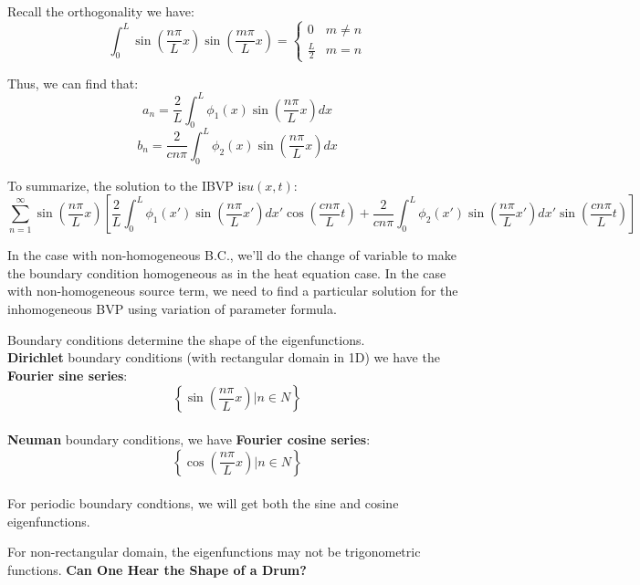 \documentclass[12pt]{article} %
\begin{document}
Recall the orthogonality we have:
$$
\int_{0}^{L}\sin(\frac{n\pi}{L}x)\sin(\frac{m\pi}{L}x) = \left\{
\begin{array}{lll}
 0& m\neq n \\
\frac{L}{2} & m= n
\end{array}\right.
$$ \par
Thus, we can find that:
$$
a_{n}=\frac{2}{L}\int_{0}^{L}\phi_{1}(x)\sin(\frac{n\pi}{L}x)dx
$$
$$
b_{n}=\frac{2}{cn\pi}\int_{0}^{L}\phi_{2}(x)\sin(\frac{n\pi}{L}x)dx
$$\par
To summarize, the solution to the IBVP is$u(x, t)$:
$$
\sum_{n=1}^{\infty}\sin(\frac{n\pi}{L}x)\left[\frac{2}{L}\int_{0}^{L}\phi_{1}(x')\sin(\frac{n\pi}{L}x')dx'\cos(\frac{cn\pi}{L}t) +
\frac{2}{cn\pi}\int_{0}^{L}\phi_{2}(x')\sin(\frac{n\pi}{L}x')dx'\sin(\frac{cn\pi}{L}t)\right]
$$\par
In the case with non-homogeneous B.C., we'll do the change of variable to make the boundary condition homogeneous as in the heat equation case. In the case with non-homogeneous source term, we need to find a particular solution for the inhomogeneous BVP using variation of parameter formula. \par
Boundary conditions determine the shape of the eigenfunctions. \\
\textbf{Dirichlet} boundary conditions (with rectangular domain in 1D) we have the \textbf{Fourier sine series}:
$$
\left\{ \sin(\frac{n\pi}{L}x) | n\in N
\right\}
$$\\
\textbf{Neuman} boundary conditions, we have \textbf{Fourier cosine series}:
$$
\left\{ \cos(\frac{n\pi}{L}x) | n\in N
\right\}
$$\\
For periodic boundary condtions, we will get both the sine and cosine eigenfunctions.\par
For non-rectangular domain, the eigenfunctions may not be trigonometric functions. \textbf{Can One Hear the Shape of a Drum?}\par
\end{document}
